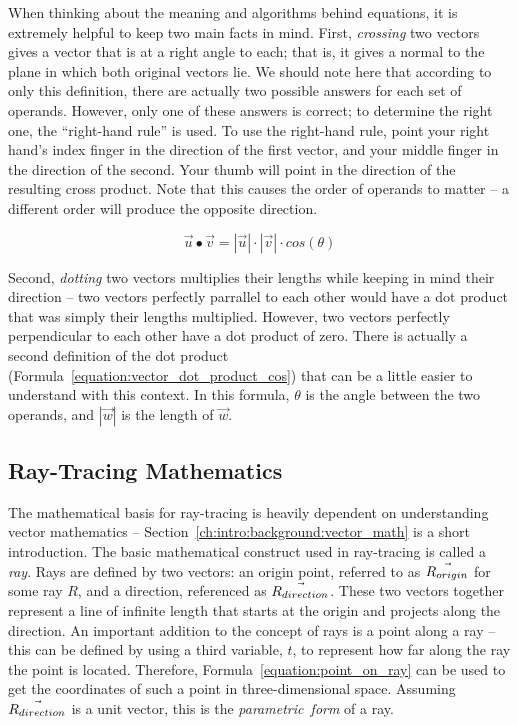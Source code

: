 When thinking about the meaning and algorithms behind equations, it is extremely helpful to keep two main facts in mind.
First, {\it crossing} two vectors gives a vector that is at a right angle to each; that is, it gives a normal to the plane in which both original vectors lie.
We should note here that according to only this definition, there are actually two possible answers for each set of operands.
However, only one of these answers is correct; to determine the right one, the ``right-hand rule'' is used.
To use the right-hand rule, point your right hand's index finger in the direction of the first vector, and your middle finger in the direction of the second.
Your thumb will point in the direction of the resulting cross product.
Note that this causes the order of operands to matter -- a different order will produce the opposite direction.

\begin{equation}
  \label{equation:vector_dot_product_cos}
  \vec{u} \bullet \vec{v} = |\vec{u}| \cdot |\vec{v}| \cdot cos(\theta)
\end{equation}

Second, {\it dotting} two vectors multiplies their lengths while keeping in mind their direction -- two vectors perfectly parrallel to each other would have a dot product that was simply their lengths multiplied.
However, two vectors perfectly perpendicular to each other have a dot product of zero.
There is actually a second definition of the dot product (Formula~\ref{equation:vector_dot_product_cos}) that can be a little easier to understand with this context.
In this formula, $\theta$ is the angle between the two operands, and $|\vec{w}|$ is the length of $\vec{w}$.

\subsection{Ray-Tracing Mathematics}
\label{ch:intro:background:raytracing_math}

The mathematical basis for ray-tracing is heavily dependent on understanding vector mathematics -- Section~\ref{ch:intro:background:vector_math} is a short introduction.
The basic mathematical construct used in ray-tracing is called a {\it ray}. Rays are defined by two vectors: an origin point, referred to as $\vec{R_{origin}}$ for some ray $R$, and a direction, referenced as $\vec{R_{direction}}$.
These two vectors together represent a line of infinite length that starts at the origin and projects along the direction.
An important addition to the concept of rays is a point along a ray -- this can be defined by using a third variable, $t$, to represent how far along the ray the point is located.
Therefore, Formula~\ref{equation:point_on_ray} can be used to get the coordinates of such a point in three-dimensional space.
Assuming $\vec{R_{direction}}$ is a unit vector, this is the {\it parametric~form} of a ray.

